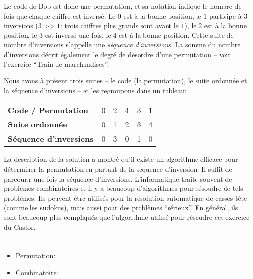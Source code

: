 {{Le code de Bob est donc une permutation, et sa notation indique le nombre de fois que chaque chiffre est inversé: Le $0$ est à la bonne position, le $1$ participe à $3$ inversions ($3$ >\textcompwordmark{}> $1$: trois chiffres plus grands sont avant le $1$), le $2$ est à la bonne position, le $3$ est inversé une fois, le $4$ est à la bonne position. Cette suite de nombre d’inversions s’appelle une \emph{séquence d’inversions}. La somme du nombre d’inversions décrit également le degré de désordre d’une permutation – voir l’exercice “Train de marchandises”.

Nous avons à présent trois suites – le code (la permutation), le suite ordonnée et la séquence d’inversions – et les regroupons dans un tableau:

\begin{adjustwidth}{1.5em}{0em}
\begin{tabular}{ @{} l l l l l l @{} }
  \textbf{Code / Permutation} & 0 & 2 & 4 & 3 & 1 \\ 
  \textbf{Suite ordonnée} & 0 & 1 & 2 & 3 & 4 \\ 
  \textbf{Séquence d’inversions} & 0 & 3 & 0 & 1 & 0
\end{tabular}


\end{adjustwidth}

La description de la solution a montré qu’il existe un algorithme efficace pour déterminer la permutation en partant de la séquence d’inversion. Il suffit de parcourir une fois la séquence d’inversions. L’informatique traite souvent de problèmes combinatoires et il y a beaucoup d’algorithmes pour résoudre de tels problèmes. Ils peuvent être utilisés pour la résolution automatique de casses-tête (comme les sudokus), mais aussi pour des problèmes “sérieux”. En général, ils sont beaucoup plus compliqués que l’algorithme utilisé pour résoudre cet exercice du Castor.



\section*{\BrochureWebsitesAndKeywords}
{\raggedright
\begin{itemize}
  \item Permutation: \href{https://fr.wikipedia.org/wiki/Permutation}{}
  \item Combinatoire: \href{https://fr.wikipedia.org/wiki/Combinatoire}{}
\end{itemize}


}}}
